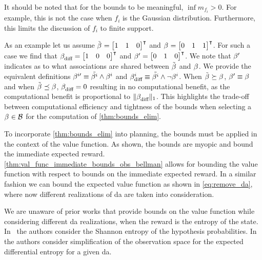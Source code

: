 It should be noted that for the bounds to be meaningful, $\inf m_{f_i}>0$. For example, this is not the case when $f_i$ is the Gaussian distribution. Furthermore, this limits the discussion of $f_i$ to finite support.

As an example let us assume $\tilde{\beta_{}^{}}=\begin{bmatrix}1&1&0\end{bmatrix}^\intercal$ and $\beta_{}^{}=\begin{bmatrix}0&1&1\end{bmatrix}^\intercal$. For such a case we find that $\beta_{\textup{diff}}^{}=\begin{bmatrix}1&0&0\end{bmatrix}^\intercal$ and $\beta_{}^{\prime}=\begin{bmatrix}0&1&0\end{bmatrix}^\intercal$. We note that $\beta_{}^{\prime}$ indicates as to what associations are shared between $\tilde{\beta_{}^{}}$ and $\beta_{}^{}$. We provide the equivalent definitions $\beta_{}^{i\prime}\equiv \tilde{\beta_{}^{i}}\land\beta_{}^{i}$ and $\beta_{\textup{diff}}^{i}\equiv \tilde{\beta_{}^{i}}\land\lnot\beta_{}^{i}$.
When $\tilde{\beta_{}^{}}\succeq\beta_{}^{}$, $\beta_{}^{\prime}\equiv\beta_{}^{}$ and when $\tilde{\beta_{}^{}}\preceq\beta_{}^{}$, $\beta_{\textup{diff}}^{}=0$ resulting in no computational benefit, as the computational benefit is proportional to $\lVert\beta_{\textup{diff}}^{}\rVert_1$. This highlights the trade-off between computational efficiency and tightness of the bounds when selecting a $\beta_{}^{}\in\mathcal B$ for the computation of \autoref{thm:bounds_elim}.

To incorporate \autoref{thm:bounds_elim} into planning, the bounds must be applied in the context of the value function. As shown, the bounds are myopic and bound the immediate expected reward. \autoref{thm:val_func_immediate_bounds_obs_bellman} allows for bounding the value function with respect to bounds on the immediate expected reward. In a similar fashion we can bound the expected value function as shown in \eqref{eq:remove_da}, where now different realizations of \gls{da} are taken into consideration.

We are unaware of prior works that provide bounds on the value function while considering different \gls{da} realizations, when the reward is the entropy of the state. In~\cite{Shienman22icra} the authors consider the Shannon entropy of the hypothesis probabilities. In~\cite{Yotam24tro} the authors consider simplification of the observation space for the expected differential entropy for a given \gls{da}.